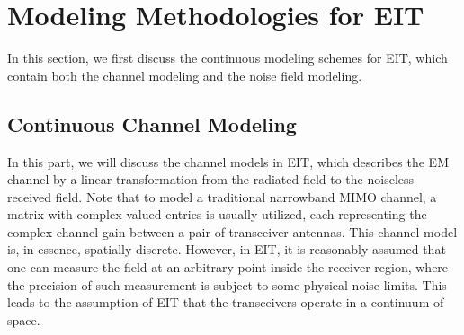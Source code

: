 \documentclass[journal,twocolumn]{IEEEtran}
\begin{document}


\section{Modeling Methodologies for EIT}
In this section, we first discuss the continuous modeling schemes for EIT, which contain both the channel modeling and the noise field modeling. 

\subsection{Continuous Channel Modeling}
In this part, we will discuss the channel models in EIT, which describes the EM channel by a linear transformation from the radiated field to the noiseless received field.  
Note that to model a traditional narrowband MIMO channel, a matrix with complex-valued entries is usually utilized, each representing the complex channel gain between a pair of transceiver antennas. 
This channel model is, in essence, spatially discrete. 
However, in EIT, it is reasonably assumed that one can measure the field at an arbitrary point inside the receiver region, where the precision of such measurement is subject to some physical noise limits. This leads to the assumption of EIT that the transceivers operate in a continuum of space.  
\end{document}

